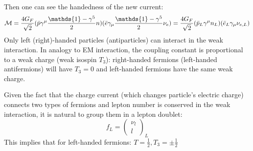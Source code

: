 Then one can see the handedness of the new current:
\begin{equation}
    \CM = \frac{4G_F}{\sqrt{2}}(\bar{p} \gamma^\mu\frac{\mathds{1} - \gamma^5}{2} n) (\bar{e} \gamma_\mu\frac{\mathds{1} - \gamma^5}{2} \nu_e) 
    = \frac{4G_F}{\sqrt{2}}(\bar{p}_L \gamma^\mu n_L)(\bar{e}_L \gamma_\mu \nu_{e,L})
\end{equation}
Only left (right)-handed particles (antiparticles) can interact in the weak interaction.
In analogy to EM interaction, the coupling constant is proportional to a weak
charge (weak isospin $T_3$): right-handed fermions (left-handed antifermions) 
will have $T_3 = 0$ and left-handed fermions have the same weak charge. 

Given the fact that the charge current (which changes particle's electric charge) 
connects two types of fermions and lepton number is conserved in the weak interaction, 
it is natural to group them in a lepton doublet: 
\begin{equation}
    f_L = \begin{pmatrix} \nu_l \\ l \end{pmatrix}_L
\end{equation}
This implies that for left-handed fermions: $T=\frac{1}{2}, T_3 = \pm\frac{1}{2}$ 

